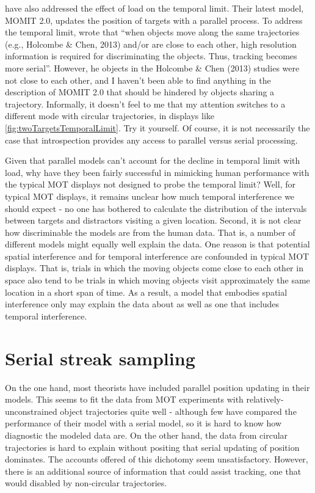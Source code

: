 \documentclass[
]{book}
\begin{document}
\citet{liModelMultipleIdentity2019} have also addressed the effect of load on the temporal limit. Their latest model, MOMIT 2.0, updates the position of targets with a parallel process. To address the temporal limit, \citet{liModelMultipleIdentity2019} wrote that ``when objects move along the same trajectories (e.g., Holcombe \& Chen, 2013) and/or are close to each other, high resolution information is required for discriminating the objects. Thus, tracking becomes more serial''. However, he objects in the Holcombe \& Chen (2013) studies were not close to each other, and I haven't been able to find anything in the description of MOMIT 2.0 that should be hindered by objects sharing a trajectory. Informally, it doesn't feel to me that my attention switches to a different mode with circular trajectories, in displays like \ref{fig:twoTargetsTemporalLimit}. Try it yourself. Of course, it is not necessarily the case that introspection provides any access to parallel versus serial processing.

Given that parallel models can't account for the decline in temporal limit with load, why have they been fairly successful in mimicking human performance with the typical MOT displays not designed to probe the temporal limit? Well, for typical MOT displays, it remains unclear how much temporal interference we should expect - no one has bothered to calculate the distribution of the intervals between targets and distractors visiting a given location. Second, it is not clear how discriminable the models are from the human data. That is, a number of different models might equally well explain the data. One reason is that potential spatial interference and for temporal interference are confounded in typical MOT displays. That is, trials in which the moving objects come close to each other in space also tend to be trials in which moving objects visit approximately the same location in a short span of time. As a result, a model that embodies spatial interference only may explain the data about as well as one that includes temporal interference.

\hypertarget{resolution}{%
\chapter{Serial streak sampling}\label{resolution}}

On the one hand, most theorists have included parallel position updating in their models. This seems to fit the data from MOT experiments with relatively-unconstrained object trajectories quite well - although few have compared the performance of their model with a serial model, so it is hard to know how diagnostic the modeled data are. On the other hand, the data from circular trajectories is hard to explain without positing that serial updating of position dominates. The accounts offered of this dichotomy seem unsatisfactory. However, there is an additional source of information that could assist tracking, one that would disabled by non-circular trajectories.
\end{document}
